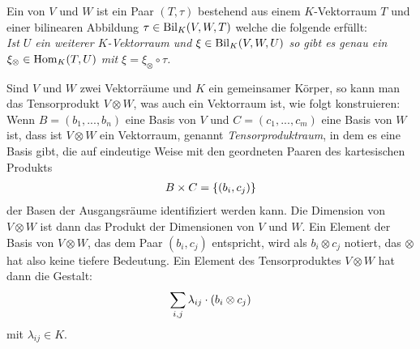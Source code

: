 \begin{definition}[Tensorprodukt]
	Ein  von $V$ und $W$ ist ein Paar $(T,\tau)$ bestehend aus einem $K$-Vektorraum $T$ und einer bilinearen Abbildung $\tau\in\operatorname{Bil}_K(V,W,T)$ welche die folgende  erfüllt: \\
	\textit{Ist $U$ ein weiterer $K$-Vektorraum und $\xi\in\operatorname{Bil}_K(V,W,U)$ so gibt es genau ein $\xi_\otimes\in\operatorname{Hom}_K(T,U)$ mit $\xi=\xi_\otimes\circ\tau$.}
	\begin{center}
	\end{center}
\end{definition}

\begin{*anmerkung}
	Sind $V$ und $W$ zwei Vektorräume und $K$ ein gemeinsamer Körper, so kann man das Tensorprodukt $V\otimes W$, was auch ein Vektorraum ist, wie folgt konstruieren: Wenn $B=(b_1,...,b_n)$ eine Basis von $V$ und $C=(c_1,...,c_m)$ eine Basis von $W$ ist, dass ist $V\otimes W$ ein Vektorraum, genannt \textit{Tensorproduktraum}, in dem es eine Basis gibt, die auf eindeutige Weise mit den geordneten Paaren des kartesischen Produkts
	\begin{align}
		B\times C=\{(b_i,c_j)\}\notag
	\end{align}
	der Basen der Ausgangsräume identifiziert werden kann. Die Dimension von $V\otimes W$ ist dann das Produkt der Dimensionen von $V$ und $W$. Ein Element der Basis von $V\otimes W$, das dem Paar $(b_i,c_j)$ entspricht, wird als $b_i\otimes c_j$ notiert, das $\otimes$ hat also keine tiefere Bedeutung. Ein Element des Tensorproduktes $V\otimes W$ hat dann die Gestalt:
	\begin{align}
		\sum_{i,j} \lambda_{ij}\cdot (b_i\otimes c_j)\notag
	\end{align}
	mit $\lambda_{ij}\in K$.
\end{*anmerkung}

